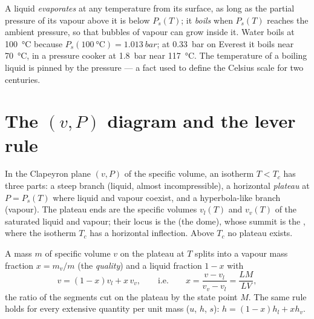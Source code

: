 \begin{remark}\label{rem:b1:phase-changes:boiling}
A liquid \emph{evaporates} at any temperature from its surface, as long
as the partial pressure of its vapour above it is below $P_s(T)$; it
\emph{boils} when $P_s(T)$ reaches the ambient pressure, so that bubbles
of vapour can grow inside it. Water boils at \qty{100}{\degreeCelsius}
because $P_s(\qty{100}{\degreeCelsius}) = \qty{1.013}{bar}$; at
\qty{0.33}{bar} on Everest it boils near \qty{70}{\degreeCelsius}, in a
pressure cooker at \qty{1.8}{bar} near \qty{117}{\degreeCelsius}. The
temperature of a boiling liquid is pinned by the pressure --- a fact
used to define the Celsius scale for two centuries.
\end{remark}

\section{The $(v, P)$ diagram and the lever rule}

\begin{proposition}\label{prop:b1:phase-changes:andrews}
In the Clapeyron plane $(v, P)$ of the specific volume, an isotherm
$T < T_c$ has three parts: a steep branch (liquid, almost
incompressible), a horizontal \emph{plateau} at $P = P_s(T)$ where liquid
and vapour coexist, and a hyperbola-like branch (vapour). The plateau
ends are the specific volumes $v_l(T)$ and $v_v(T)$ of the saturated
liquid and vapour; their locus is the \emph{} (the
dome), whose summit is the , where the isotherm $T_c$
has a horizontal inflection. Above $T_c$ no plateau exists.
\end{proposition}
\admitted

\begin{theorem}\label{thm:b1:phase-changes:lever}
A mass $m$ of specific volume $v$ on the plateau at $T$ splits into a
vapour mass fraction $x = m_v/m$ (the \emph{quality}) and a liquid
fraction $1 - x$ with
\[
v = (1 - x)v_l + x\,v_v , \qquad\text{i.e.}\qquad
x = \frac{v - v_l}{v_v - v_l} = \frac{LM}{LV} ,
\]
the ratio of the segments cut on the plateau by the state point $M$.
The same rule holds for every extensive quantity per unit mass ($u$,
$h$, $s$): $h = (1 - x)h_l + xh_v$.
\end{theorem}

